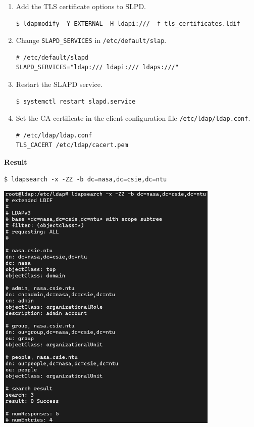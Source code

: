 \documentclass[12pt, a4paper]{article}
\begin{document}
\begin{enumerate}[label=(\alph*)]
\begin{enumerate}[label=(\arabic*)]
      \item Add the TLS certificate options to SLPD.
      \begin{Verbatim}[frame=single]
$ ldapmodify -Y EXTERNAL -H ldapi:/// -f tls_certificates.ldif
      \end{Verbatim}

      \item Change \verb|SLAPD_SERVICES| in \verb|/etc/default/slap|.
      \begin{Verbatim}[frame=single]
# /etc/default/slapd
SLAPD_SERVICES="ldap:/// ldapi:/// ldaps:///"
      \end{Verbatim}

      \item Restart the SLAPD service.
      \begin{Verbatim}[frame=single]
$ systemctl restart slapd.service
      \end{Verbatim}

      \item Set the CA certificate in the client configuration file
      \verb|/etc/ldap/ldap.conf|.
      \begin{Verbatim}[frame=single]
# /etc/ldap/ldap.conf
TLS_CACERT /etc/ldap/cacert.pem
      \end{Verbatim}
    \end{enumerate}
    \textbf{Result}
    \begin{Verbatim}[frame=single]
$ ldapsearch -x -ZZ -b dc=nasa,dc=csie,dc=ntu
    \end{Verbatim}

    \includegraphics[width=0.8\textwidth]{1-b_ldapsearch_starttls.png}


\end{enumerate}
\end{document}
